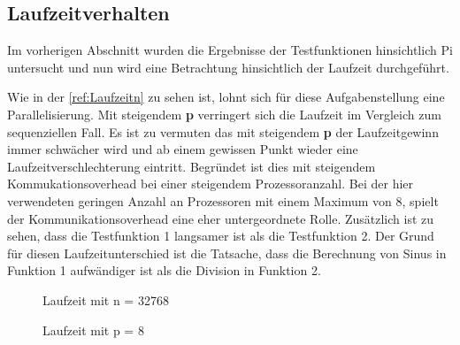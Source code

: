 \subsection{Laufzeitverhalten}
Im vorherigen Abschnitt wurden die Ergebnisse der Testfunktionen hinsichtlich Pi untersucht und nun wird eine Betrachtung hinsichtlich der Laufzeit durchgeführt.

Wie in der \autoref{ref:Laufzeitn} zu sehen ist, lohnt sich für diese Aufgabenstellung eine Parallelisierung.
Mit steigendem \textbf{p} verringert sich die Laufzeit im Vergleich zum sequenziellen Fall.
Es ist zu vermuten das mit steigendem \textbf{p} der Laufzeitgewinn immer schwächer wird und ab einem gewissen Punkt wieder eine Laufzeitverschlechterung eintritt.
Begründet ist dies mit steigendem Kommukationsoverhead bei einer steigendem Prozessoranzahl.
Bei der hier verwendeten geringen Anzahl an Prozessoren mit einem Maximum von 8, spielt der Kommunikationsoverhead eine eher untergeordnete Rolle.
Zusätzlich ist zu sehen, dass die Testfunktion 1 langsamer ist als die Testfunktion 2.
Der Grund für diesen Laufzeitunterschied ist die Tatsache, dass die Berechnung von Sinus in Funktion 1 aufwändiger ist als die Division in Funktion 2.
\begin{figure}[h]
\begin{minipage}{0.49\textwidth}
	\caption{Laufzeit mit n = 32768}
	\label{ref:Laufzeitn}
\end{minipage}
\hfill
\begin{minipage}{0.49\textwidth}
	\caption{Laufzeit mit p = 8}
	\label{ref:LaufzeitP}
\end{minipage}
\end{figure}

